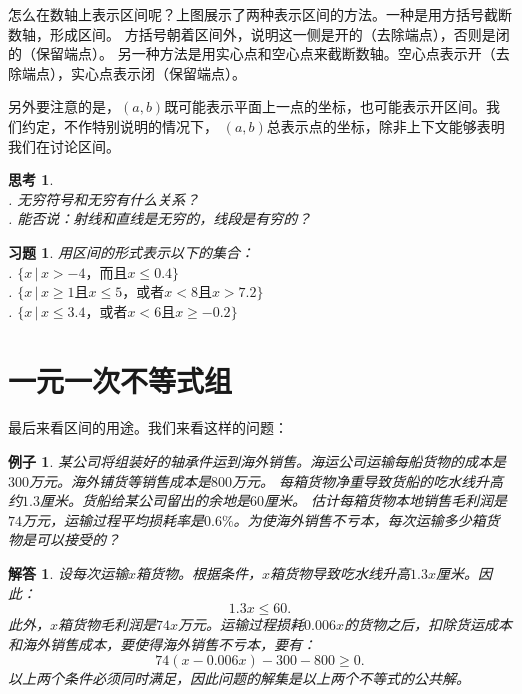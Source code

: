 \documentclass[12pt,UTF8]{ctexbook}
\newtheorem{ex}{例子}[section]
\newtheorem{sk}{思考}[section]
\newtheorem*{so}{解答}
\newtheorem{xt}{习题}[section]
\begin{document}
怎么在数轴上表示区间呢？上图展示了两种表示区间的方法。一种是用方括号截断数轴，形成区间。
方括号朝着区间外，说明这一侧是开的（去除端点），否则是闭的（保留端点）。
另一种方法是用实心点和空心点来截断数轴。空心点表示开（去除端点），实心点表示闭（保留端点）。

另外要注意的是，$(a, b)$既可能表示平面上一点的坐标，也可能表示开区间。我们约定，不作特别说明的情况下，
$(a, b)$总表示点的坐标，除非上下文能够表明我们在讨论区间。
\begin{sk}\label{sk:5-4-0}
    \mbox{}\\
    . 无穷符号和无穷有什么关系？\\
    . 能否说：射线和直线是无穷的，线段是有穷的？
\end{sk}
\begin{xt}\label{xt:5-4-0}
    用区间的形式表示以下的集合：\\
    . $\{x \, | \, x > -4 \mbox{，而且} x \leqslant 0.4 \}$ \\
    . $\{x \, | \, x \geqslant 1 \mbox{且} x \leqslant 5 \mbox{，或者} x < 8  \mbox{且} x > 7.2 \}$ \\
    . $\{x \, | \, x \leqslant 3.4 \mbox{，或者} x < 6  \mbox{且} x \geqslant -0.2 \}$
\end{xt}

\section{一元一次不等式组}
最后来看区间的用途。我们来看这样的问题：
\begin{ex}\label{ex:5-5-0}
    某公司将组装好的轴承件运到海外销售。海运公司运输每船货物的成本是$300$万元。海外铺货等销售成本是$800$万元。
    每箱货物净重导致货船的吃水线升高约$1.3$厘米。货船给某公司留出的余地是$60$厘米。
    估计每箱货物本地销售毛利润是$74$万元，运输过程平均损耗率是$0.6\%$。为使海外销售不亏本，每次运输多少箱货物是可以接受的？
\end{ex}

\begin{so}
    设每次运输$x$箱货物。根据条件，$x$箱货物导致吃水线升高$1.3x$厘米。因此：
    $$ 1.3x \leqslant  60.$$
    此外，$x$箱货物毛利润是$74x$万元。运输过程损耗$0.006x$的货物之后，扣除货运成本和海外销售成本，要使得海外销售不亏本，要有：
    $$ 74 (x - 0.006x) - 300 - 800 \geqslant 0. $$
    以上两个条件必须同时满足，因此问题的解集是以上两个不等式的公共解。
\end{so}
\end{document}
